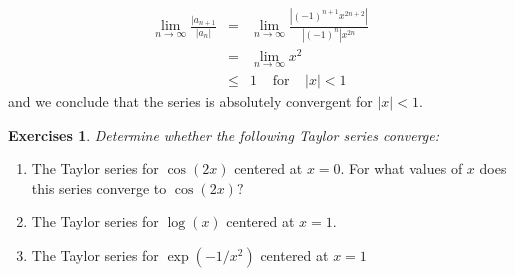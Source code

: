 \documentclass[12pt,a4paper]{article} %
\newtheorem{exer}{Exercises}
\begin{document}
\begin{eqnarray*}
\lim_{n\rightarrow\infty}\frac{|a_{n+1}}{|a_n|} &=& \lim_{n\rightarrow\infty}\frac{|(-1)^{n+1}x^{2n+2}|}{|(-1)^n|x^{2n}}\\
&=&\lim_{n\rightarrow\infty}x^2\\
&\leq & 1 \;\;\;\;\mathrm{  for } \;\;\;\;|x|<1
\end{eqnarray*}
and we conclude that the series is absolutely convergent for $|x|<1$.
\begin{exer}
Determine whether the following Taylor series converge:
\end{exer}
\begin{enumerate}
\item The Taylor series for $\cos(2x)$ centered at $x=0$.  For what values of $x$ does this series converge to $\cos(2x)?$
\item The Taylor series for $\log(x)$ centered at $x=1$.
\item The Taylor series for $\exp(-1/x^2)$ centered at $x=1$
\end{enumerate}
\end{document}

